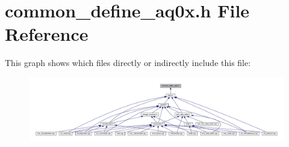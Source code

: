 \hypertarget{a00031}{\section{common\+\_\+define\+\_\+aq0x.\+h File Reference}
\label{a00031}
}
This graph shows which files directly or indirectly include this file\+:
\nopagebreak
\begin{figure}[H]
\begin{center}
\leavevmode
\includegraphics[width=350pt]{d9/db6/a00146}
\end{center}
\end{figure}
